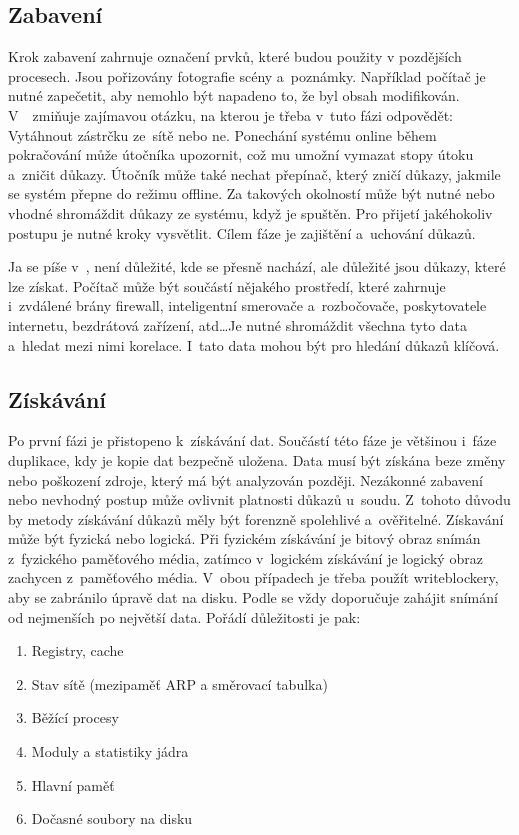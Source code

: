 \documentclass[thesis=B,czech]{FITthesis}[2012/06/26]
\begin{document}
\subsection{Zabavení}
Krok zabavení zahrnuje označení prvků, které budou použity v pozdějších procesech. Jsou pořizovány fotografie scény a~poznámky. Například počítač je nutné zapečetit, aby nemohlo být napadeno to, že byl obsah modifikován. V~\cite{for_sez}~zmiňuje zajímavou otázku, na kterou je třeba v~tuto fázi odpovědět: Vytáhnout zástrčku ze~sítě nebo ne. Ponechání systému online během pokračování může útočníka upozornit, což mu umožní vymazat stopy útoku a~zničit důkazy. Útočník může také nechat přepínač, který zničí důkazy, jakmile se systém přepne do režimu offline. Za takových okolností může být nutné nebo vhodné shromáždit důkazy ze systému, když je spuštěn. Pro přijetí jakéhokoliv postupu je nutné kroky vysvětlit. Cílem fáze je zajištění a~uchování důkazů.

Ja se píše v~\cite{palmer2002forensic}, není důležité, kde se přesně nachází, ale důležité jsou důkazy, které lze získat. Počítač může být součástí nějakého prostředí, které zahrnuje i~zvdálené brány firewall, inteligentní smerovače a~rozbočovače, poskytovatele internetu, bezdrátová zařízení, atd\dots Je nutné shromáždit všechna tyto data a~hledat mezi nimi korelace. I~tato data mohou být pro hledání důkazů klíčová.

\subsection{Získávání}
Po první fázi je přistopeno k~získávání dat. Součástí této fáze je většinou i~fáze duplikace, kdy je kopie dat bezpečně uložena. Data musí být získána beze změny nebo poškození zdroje, který má být analyzován později. Nezákonné zabavení nebo nevhodný postup může ovlivnit platnosti důkazů u~soudu. Z~tohoto důvodu by metody získávání důkazů měly být forenzně spolehlivé a~ověřitelné. Získavání může být fyzická nebo logická. Při fyzickém získávání je bitový obraz snímán z~fyzického paměťového média, zatímco v~logickém získávání je logický obraz zachycen z~paměťového média. V~obou případech je třeba použít writeblockery, aby se zabránilo úpravě dat na disku. Podle \cite{for_sez} se vždy doporučuje zahájit snímání od nejmenších po největší data. Pořádí důležitosti je pak: 

\begin{enumerate}
\item Registry, cache
\item Stav sítě (mezipaměť ARP a směrovací tabulka)
\item Běžící procesy
\item Moduly a statistiky jádra
\item Hlavní paměť
\item Dočasné soubory na disku
\end{enumerate}
\end{document}
